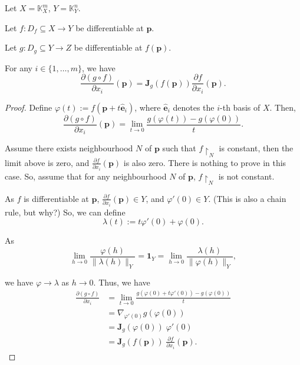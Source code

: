 \documentclass{article}
\begin{document}
\begin{proposition}
	\label{prop: chain rule of partial derivatives}
	Let $X = \mathbb K_X^m$, $Y = \mathbb K_Y^n$.
	
	Let $f: D_f \subseteq X \to Y$ be differentiable at $\mathbf p$.
	
	Let $g: D_g \subseteq Y \to Z$ be differentiable at $f(\mathbf p)$.
	
	For any $i \in \{1, \ldots , m\}$, we have
	$$
	\frac{\partial (g \circ f)}{\partial x_i }(\mathbf p) = \mathbf J_{g} (f(\mathbf p)) \frac{\partial f}{\partial x_i} (\mathbf p).
	$$
	
	\begin{proof}
	
		Define $\varphi(t) := f(\mathbf p + t \mathbf{\hat e}_i)$, where $\mathbf{\hat e}_i$ denotes the $i$-th basis of $X$. Then,
		$$
		\frac{\partial (g \circ f)}{\partial x_i}(\mathbf p) = \lim_{t \to 0} \frac{g(\varphi(t)) - g(\varphi(0))}{t}.
		$$
		
		Assume there exists neighbourhood $N$ of $\mathbf p$ such that $f \restriction_N$ is constant, then the limit above is zero, and $\frac{\partial f}{\partial x_i}(\mathbf p)$ is also zero. There is nothing to prove in this case. So, assume that for any neighbourhood $N$ of $\mathbf p$, $f \restriction_N$ is not constant.
		
		As $f$ is differentiable at $\mathbf p$, $\frac{\partial f}{\partial x_i} (\mathbf p) \in Y$, and $\varphi'(0) \in Y$. (This is also a chain rule, but why?) So, we can define
		$$
		\lambda (t) := t \varphi'(0) + \varphi(0).
		$$
		
		As
		$$
		\lim_{h \to 0}\frac{\varphi (h)}{\| \lambda(h) \|_Y} = \mathbf 1_Y = \lim_{h \to 0}\frac{\lambda (h)}{\| \varphi(h) \|_Y},
		$$
		
		we have $\varphi \to \lambda$ as $h \to 0$. Thus, we have
		$$
		\begin{aligned}
			\frac{\partial (g \circ f)}{\partial x_i} &= \lim_{t \to 0} \frac{g(\varphi(0) + t\varphi'(0)) - g(\varphi(0))}{t} \\
			&= \nabla_{\varphi'(0)} g (\varphi(0)) \\
			&= \mathbf J_g(\varphi(0)) \; \varphi'(0) \\
			&= \mathbf J_{g}(f(\mathbf p)) \; \frac{\partial f}{\partial x_i}(\mathbf p).
		\end{aligned}
		$$
	\end{proof}
\end{proposition}
\end{document}
